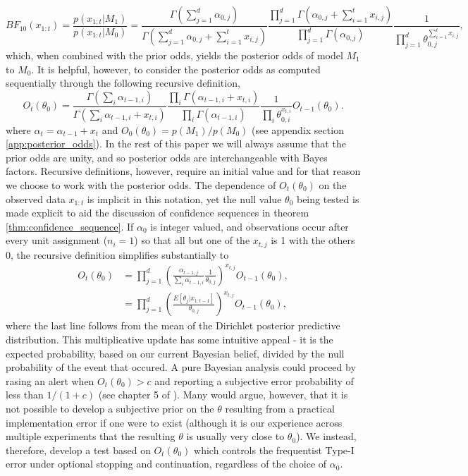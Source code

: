 \documentclass[11pt]{article}
\begin{document}
\begin{equation}
  \label{eq:bayes_factor}
 BF_{10}(x_{1:t}) = \frac{p(x_{1:t}|M_1)}{p(x_{1:t}|M_0)} = \frac{\Gamma(\sum_{j=1}^{d} \alpha_{0,j})}{\Gamma(\sum_{j=1}^{d} \alpha_{0,j} + \sum_{i=1}^{t}x_{i,j})}\frac{\prod_{j=1}^{d}\Gamma(\alpha_{0,j} + \sum_{i=1}^{t}x_{i,j} )}{\prod_{j=1}^{d}\Gamma(\alpha_{0,j} )}\frac{1}{\prod_{j=1}^{d} \theta_{0,j}^{\sum_{i=1}^{t}x_{i,j}}},
\end{equation}
which, when combined with the prior odds, yields the posterior odds of model $M_1$ to $M_0$.
It is helpful, however, to consider the posterior odds as computed sequentially through the following recursive definition,
\begin{equation}
  \label{eq:update_rule}
  O_{t}(\theta_0) = \frac{\Gamma(\sum_i \alpha_{t-1,i})}{\Gamma(\sum_i \alpha_{t-1,i} +  x_{t,i})} \frac{\prod_i \Gamma(\alpha_{t-1,i} + x_{t,i})}{\prod_i \Gamma(\alpha_{t-1,i})} \frac{1}{\prod_i \theta_{0,i}^{x_{t,i}}}  O_{t-1}(\theta_0).
\end{equation}
where $\alpha_t = \alpha_{t-1}+x_t$ and $O_0(\theta_0)=p(M_1)/p(M_0)$ (see appendix section \ref{app:posterior_odds}). In the rest of this paper we will always assume that the prior odds are unity, and so posterior odds are interchangeable with Bayes factors. Recursive definitions, however, require an initial value and for that reason we choose to work with the posterior odds. The dependence of $O_t(\theta_0)$ on the observed data $x_{1:t}$ is implicit in this notation, yet the null value $\theta_0$ being tested is made explicit to aid the discussion of confidence sequences in theorem \ref{thm:confidence_sequence}. If $\alpha_0$ is integer valued, and observations occur after every unit assignment ($n_i=1$) so that all but one of the $x_{t,j}$ is 1 with the others 0, the recursive definition simplifies substantially to
\begin{align}
  \label{eq:simplified_bayes_factor}
  O_{t}(\theta_0) &= \prod_{j=1}^{d} \left(\frac{\alpha_{t-1,j}}{\sum_i \alpha_{t-1,i}} \frac{1}{\theta_{0,j}}\right)^{x_{t,j}} O_{t-1}(\theta_0),\\
  &=\prod_{j=1}^{d}\left(\frac{E[\theta_j|x_{1:t-1}]}{\theta_{0,j}} \right)^{x_{t,j}} O_{t-1}(\theta_0),
\end{align}
where the last line follows from the mean of the Dirichlet posterior predictive distribution. This multiplicative update has some intuitive appeal - it is the expected probability, based on our current Bayesian belief, divided by the null probability of the event that occured.
A pure Bayesian analysis could proceed by rasing an alert when $O_t(\theta_0) > c$ and reporting a subjective error probability of less than $1/(1+c)$ (see chapter 5 of \cite{bernardo}).
Many would argue, however, that it is not possible to develop a subjective prior on the $\theta$ resulting from a practical implementation error if one were to exist (although it is our experience across multiple experiments that the resulting $\theta$ is usually very close to $\theta_0$).
We instead, therefore, develop a test based on $O_t(\theta_0)$ which controls the frequentist Type-I error under optional stopping and continuation, regardless of the choice of $\alpha_0$.
\end{document}
